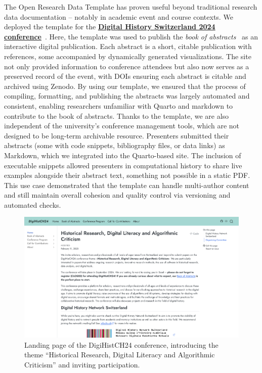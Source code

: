 \documentclass[final]{anthology-ch} %
\begin{document}
The Open Research Data Template has proven useful beyond traditional research data documentation -- notably in academic event and course contexts. We deployed the template for the \href{https://digihistch24.github.io/}{\textbf{Digital History Switzerland 2024 conference}}~\cite{baudry2024b}. Here, the template was used to publish the \emph{book of abstracts}~\cite{baudry2024a} as an interactive digital publication. Each abstract is a short, citable publication with references, some accompanied by dynamically generated visualizations. The site not only provided information to conference attendees but also now serves as a preserved record of the event, with DOIs ensuring each abstract is citable and archived using Zenodo. By using our template, we ensured that the process of compiling, formatting, and publishing the abstracts was largely automated and consistent, enabling researchers unfamiliar with Quarto and markdown to contribute to the book of abstracts. Thanks to the template, we are also independent of the university's conference management tools, which are not designed to be long-term archivable resource. Presenters submitted their abstracts (some with code snippets, bibliography files, or data links) as Markdown, which we integrated into the Quarto-based site. The inclusion of executable snippets allowed presenters in computational history to share live examples alongside their abstract text, something not possible in a static PDF. This use case demonstrated that the template can handle multi-author content and still maintain overall cohesion and quality control via versioning and automated checks.

\begin{figure}[t!]
  \centering
  \includegraphics[width=0.9\linewidth]{images/digihistch24.png}
  \caption{Landing page of the DigiHistCH24 conference, introducing the theme ``Historical Research, Digital Literacy and Algorithmic Criticism'' and inviting participation.}
  \label{fig-digihist24}
\end{figure}
\end{document}
